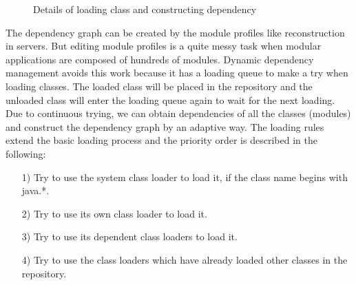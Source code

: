 \documentclass[conference]{IEEEtran}
\begin{document}
\begin{figure}[ht]
\centering
{}
\hfil
{}
\hfil
{}
\caption{Details of loading class and constructing dependency}
\label{fig:loading_queue}
\end{figure}

The dependency graph can be created by the module profiles like reconstruction in servers.
But editing module profiles is a quite messy task when modular applications are composed of hundreds of modules.
Dynamic dependency management avoids this work because it has a loading queue to make a try when loading classes.
The loaded class will be placed in the repository and the unloaded class will enter the loading queue again to wait for the next loading.
Due to continuous trying, we can obtain dependencies of all the classes (modules) and construct the dependency graph by an adaptive way.
The loading rules extend the basic loading process and the priority order is described in the following: 
\begin{itemize}[]
\item[1)] Try to use the system class loader to load it, if the class name begins with java.*.
\item[2)] Try to use its own class loader to load it.
\item[3)] Try to use its dependent class loaders to load it.
\item[4)] Try to use the class loaders which have already loaded other classes in the repository. 
\end{itemize}
\end{document}
